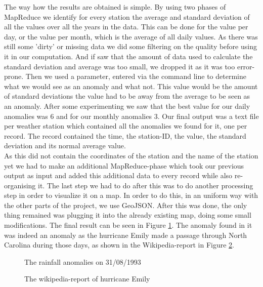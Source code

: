 The way how the results are obtained is simple. By using two phases of MapReduce we identify for every station the average and standard deviation of all the values over all the years in the data. This can be done for the value per day, or the value per month, which is the average of all daily values. As there was still some 'dirty' or missing data we did some filtering on the quality before using it in our computation. And if saw that the amount of data used to calculate the standard deviation and average was too small, we dropped it as it was too error-prone. Then we used a parameter, entered via the command line to determine what we would see as an anomaly and what not. This value would be the amount of standard deviations the value had to be away from the average to be seen as an anomaly. After some experimenting we saw that the best value for our daily anomalies was 6 and for our monthly anomalies 3. Our final output was a text file per weather station which contained all the anomalies we found for it, one per record. The record contained the time, the station-ID, the value, the standard deviation and its normal average value. \\
As this did not contain the coordinates of the station and the name of the station yet we had to make an additional MapReduce-phase which took our previous output as input and added this additional data to every record while also re-organising it. The last step we had to do after this was to do another processing step in order to visualize it on a map. In order to do this, in an uniform way with the other parts of the project, we use GeoJSON. After this was done, the only thing remained was plugging it into the already existing map, doing some small modifications. The final result can be seen in Figure \ref{fig:rainfall1}. The anomaly found in it was indeed an anomaly as the hurricane Emily made a passage through North Carolina during those days, as shown in the Wikipedia-report in Figure \ref{fig:rainfall2}.
\begin{figure}[ht]
\centering
{}
\caption{The rainfall anomalies on 31/08/1993}
\label{fig:rainfall1}
\end{figure}
\begin{figure}[ht]
\centering
{}
\caption{The wikipedia-report of hurricane Emily}
\label{fig:rainfall2}
\end{figure}
